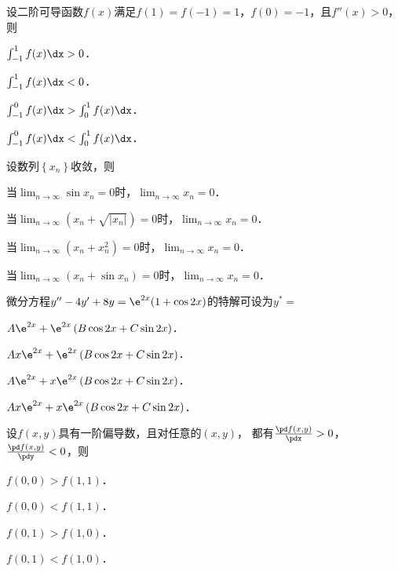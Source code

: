 \documentclass[plain,noanswer,medmath]{../../template/jnuexam}
\begin{document}








\begin{problem}
设二阶可导函数$f(x)$满足$f(1) = f(- 1) = 1$，$f(0) = - 1$，且$f''(x) > 0$，则\pickout{}
\begin{abcd}
\item $\int_{-1}^1 f(x)\dx > 0$．
\item $\int_{-1}^1 f(x)\dx < 0$．
\item $\int_{-1}^0 f(x)\dx > \int_0^1 f(x)\dx$．
\item $\int_{-1}^0 f(x)\dx < \int_0^1 f(x)\dx$．
\end{abcd}
\end{problem}


\begin{problem}
设数列$\left\{x_n \right\}$收敛，则\pickout{}
\begin{abcd}
\item 当$\lim_{n \to \infty} \sin x_n = 0$时，$\lim_{n \to \infty} x_n = 0$．
\item 当$\lim_{n \to \infty} (x_n + \sqrt{\left| x_n \right|}) = 0$时，$\lim_{n \to \infty} x_n = 0$．
\item 当$\lim_{n \to \infty} (x_n + x_n^2) = 0$时，$\lim_{n \to \infty} x_n = 0$．
\item 当$\lim_{n \to \infty} (x_n + \sin x_n) = 0$时，$\lim_{n \to \infty} x_n = 0$．
\end{abcd}
\end{problem}


\begin{problem}
微分方程$y'' - 4y' + 8y = \e^{2x}(1 + \cos 2x)$的特解可设为$y^* =$\pickout{}
\begin{abcd}
\item $A\e^{2x} + \e^{2x}\left(B\cos 2x + C\sin 2x \right)$．
\item $Ax \e^{2x} + \e^{2x}\left(B\cos 2x + C\sin 2x \right)$．
\item $A\e^{2x} + x\e^{2x}\left(B\cos 2x + C\sin 2x \right)$．
\item $Ax \e^{2x} + x\e^{2x}\left(B\cos 2x + C\sin 2x \right)$．
\end{abcd}
\end{problem}


\begin{problem}
设$f(x,y)$具有一阶偏导数，且对任意的$(x,y)$，
都有$\frac{\pd f(x,y)}{\pdx} > 0$，$\frac{\pd f(x,y)}{\pdy} < 0$，则\pickout{}
\begin{abcd}
\item $f(0,0) > f(1,1)$．
\item $f(0,0) < f(1,1)$．
\item $f(0,1) > f(1,0)$．
\item $f(0,1) < f(1,0)$．
\end{abcd}
\end{problem}
\end{document}
